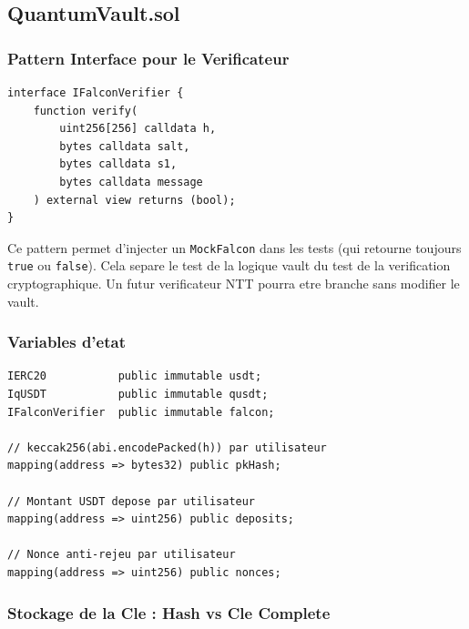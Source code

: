\documentclass[11pt,a4paper]{article}
\begin{document}
\subsection{QuantumVault.sol}

\subsubsection{Pattern Interface pour le Verificateur}

\begin{lstlisting}[style=solidity, caption={Interface IFalconVerifier}]
interface IFalconVerifier {
    function verify(
        uint256[256] calldata h,
        bytes calldata salt,
        bytes calldata s1,
        bytes calldata message
    ) external view returns (bool);
}
\end{lstlisting}

\begin{infobox}
Ce pattern permet d'injecter un \texttt{MockFalcon} dans les tests (qui retourne toujours
\texttt{true} ou \texttt{false}). Cela separe le test de la logique vault du test de la
verification cryptographique. Un futur verificateur NTT pourra etre branche sans modifier
le vault.
\end{infobox}

\subsubsection{Variables d'etat}

\begin{lstlisting}[style=solidity, caption={Stockage QuantumVault}]
IERC20           public immutable usdt;
IqUSDT           public immutable qusdt;
IFalconVerifier  public immutable falcon;

// keccak256(abi.encodePacked(h)) par utilisateur
mapping(address => bytes32) public pkHash;

// Montant USDT depose par utilisateur
mapping(address => uint256) public deposits;

// Nonce anti-rejeu par utilisateur
mapping(address => uint256) public nonces;
\end{lstlisting}

\subsubsection{Stockage de la Cle : Hash vs Cle Complete}
\end{document}
